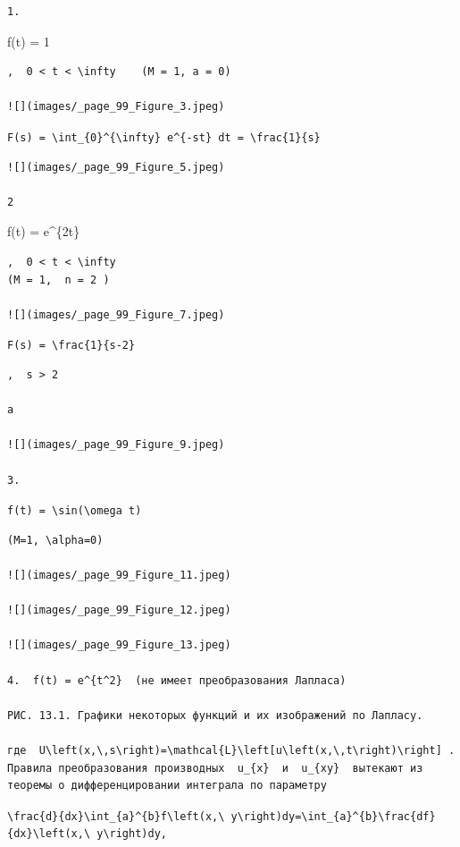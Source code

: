 \documentclass[
  ukrainian,
]{article}
\begin{document}
\begin{verbatim}
1.
\end{verbatim}

f(t) = 1

\begin{verbatim}
,  0 < t < \infty    (M = 1, a = 0)

![](images/_page_99_Figure_3.jpeg)
\end{verbatim}

\texttt{F(s)\ =\ \textbackslash{}int\_\{0\}\^{}\{\textbackslash{}infty\}\ e\^{}\{-st\}\ dt\ =\ \textbackslash{}frac\{1\}\{s\}}

\begin{verbatim}
![](images/_page_99_Figure_5.jpeg)

2
\end{verbatim}

f(t) = e\^{}\{2t\}

\begin{verbatim}
,  0 < t < \infty   
(M = 1,  n = 2 )

![](images/_page_99_Figure_7.jpeg)
\end{verbatim}

\texttt{F(s)\ =\ \textbackslash{}frac\{1\}\{s-2\}}

\begin{verbatim}
,  s > 2 

a

![](images/_page_99_Figure_9.jpeg)

3.
\end{verbatim}

\texttt{f(t)\ =\ \textbackslash{}sin(\textbackslash{}omega\ t)}

\begin{verbatim}
(M=1, \alpha=0)

![](images/_page_99_Figure_11.jpeg)

![](images/_page_99_Figure_12.jpeg)

![](images/_page_99_Figure_13.jpeg)

4.  f(t) = e^{t^2}  (не имеет преобразования Лапласа)

РИС. 13.1. Графики некоторых функций и их изображений по Лапласу.

где  U\left(x,\,s\right)=\mathcal{L}\left[u\left(x,\,t\right)\right] . Правила преобразования производных  u_{x}  и  u_{xy}  вытекают из теоремы о дифференцировании интеграла по параметру
\end{verbatim}

\texttt{\textbackslash{}frac\{d\}\{dx\}\textbackslash{}int\_\{a\}\^{}\{b\}f\textbackslash{}left(x,\textbackslash{}\ y\textbackslash{}right)dy=\textbackslash{}int\_\{a\}\^{}\{b\}\textbackslash{}frac\{df\}\{dx\}\textbackslash{}left(x,\textbackslash{}\ y\textbackslash{}right)dy,}
\end{document}
